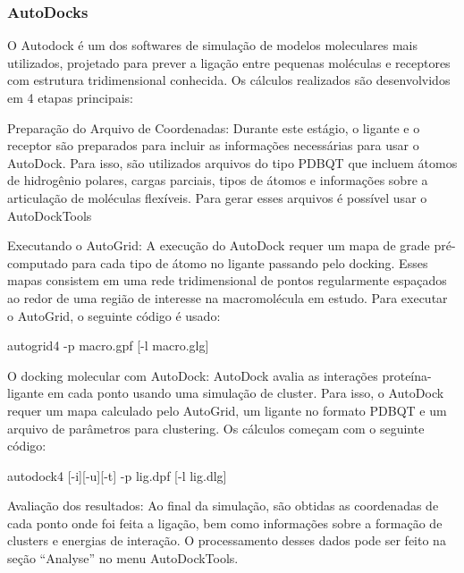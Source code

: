 \documentclass[11pt, letterpaper, portuguese]{article}
\begin{document}
\subsubsection{AutoDocks}
\par{O Autodock é um dos softwares de simulação de modelos moleculares mais utilizados, projetado para prever a ligação entre pequenas moléculas e receptores com estrutura tridimensional conhecida. Os cálculos realizados são desenvolvidos em 4 etapas principais:}
\vspace{0.4 cm}

\par{Preparação do Arquivo de Coordenadas: Durante este estágio, o ligante e o receptor são preparados para incluir as informações necessárias para usar o AutoDock. Para isso, são utilizados arquivos do tipo PDBQT que incluem átomos de hidrogênio polares, cargas parciais, tipos de átomos e informações sobre a articulação de moléculas flexíveis. Para gerar esses arquivos é possível usar o AutoDockTools}
    \par{Executando o AutoGrid: A execução do AutoDock requer um mapa de grade pré-computado para cada tipo de átomo no ligante passando pelo docking. Esses mapas consistem em uma rede tridimensional de pontos regularmente espaçados ao redor de uma região de interesse na macromolécula em estudo. Para executar o AutoGrid, o seguinte código é usado:}
    
\vspace{0.4 cm}
    autogrid4 -p macro.gpf [-l macro.glg]
\vspace{0.4 cm}

    \par{O docking molecular com AutoDock: AutoDock avalia as interações proteína-ligante em cada ponto usando uma simulação de cluster. Para isso, o AutoDock requer um mapa calculado pelo AutoGrid, um ligante no formato PDBQT e um arquivo de parâmetros para clustering. Os cálculos começam com o seguinte código:}
\vspace{0.4 cm}

autodock4 [-i][-u][-t] -p lig.dpf [-l lig.dlg]

\vspace{0.4 cm}

\par{Avaliação dos resultados: Ao final da simulação, são obtidas as coordenadas de cada ponto onde foi feita a ligação, bem como informações sobre a formação de clusters e energias de interação. O processamento desses dados pode ser feito na seção “Analyse” no menu AutoDockTools.}
\end{document}
